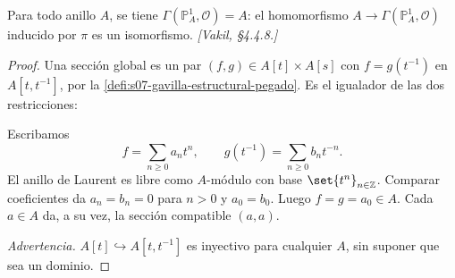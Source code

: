 \begin{prop}
\label{prop:s08-secciones-proyectiva}
Para todo anillo $A$, se tiene $\Gamma(\mathbb P_A^1,\mathcal O)=A$: el homomorfismo $A\to\Gamma(\mathbb P_A^1,\mathcal O)$ inducido por $\pi$ es un isomorfismo. \emph{[Vakil, \S4.4.8.]}
\end{prop}
\begin{proof}
Una sección global es un par $(f,g)\in A[t]\times A[s]$ con $f=g(t^{-1})$ en $A[t,t^{-1}]$, por la \cref{defi:s07-gavilla-estructural-pegado}. Es el igualador de las dos restricciones:
\begin{center}
\end{center}
Escribamos
\[
f=\sum_{n\geq0}a_nt^n,\qquad g(t^{-1})=\sum_{n\geq0}b_nt^{-n}.
\]
El anillo de Laurent es libre como $A$-módulo con base $\set{t^n}_{n\in\mathbb Z}$. Comparar coeficientes da $a_n=b_n=0$ para $n>0$ y $a_0=b_0$. Luego $f=g=a_0\in A$. Cada $a\in A$ da, a su vez, la sección compatible $(a,a)$.

\emph{Advertencia.} $A[t]\hookrightarrow A[t,t^{-1}]$ es inyectivo para cualquier $A$, sin suponer que sea un dominio.
\end{proof}


